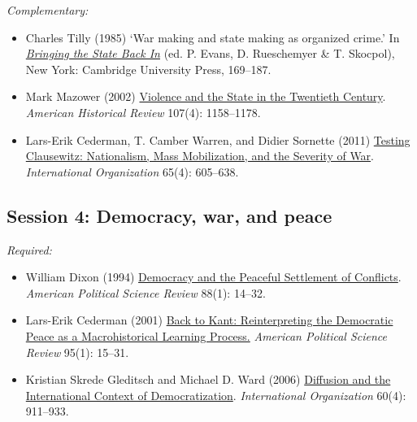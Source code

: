 \documentclass[12pt, a4paper]{article}
\begin{document}
\noindent\textit{Complementary:}

\begin{itemize}
  \item Charles Tilly (1985) `War making and state making as organized crime.' In \href{https://bibliotecas.uc3m.es/permalink/f/1qk6at5/34UC3M_ALMA21176158990004213}{\textit{Bringing the State Back In}} (ed. P. Evans, D. Rueschemyer \& T. Skocpol), New York: Cambridge University Press, 169--187.
	\item Mark Mazower (2002) \href{https://doi.org/10.1086/ahr/107.4.1158}{Violence and the State in the Twentieth Century}. \textit{American Historical Review} 107(4): 1158--1178.
	\item Lars-Erik Cederman, T.	Camber Warren, and Didier Sornette (2011) \href{https://doi.org/10.1017/S0020818311000245}{Testing Clausewitz: Nationalism, Mass Mobilization, and the Severity of War}. \textit{International Organization} 65(4): 605--638.
\end{itemize}

\vspace{20pt}
\hline
\subsection*{Session 4: Democracy, war, and peace}

\noindent\textit{Required:}

\begin{itemize}
	\item William Dixon (1994) \href{https://doi.org/10.2307/2944879}{Democracy and the Peaceful Settlement of Conflicts}. \textit{American Political Science Review} 88(1): 14--32.
  \item Lars-Erik Cederman (2001) \href{https://doi.org/10.1017/S0003055401000028}{Back to Kant: Reinterpreting the Democratic Peace as a Macrohistorical Learning Process.} \textit{American Political Science Review} 95(1): 15--31.
	\item Kristian Skrede Gleditsch and Michael D. Ward (2006) \href{https://doi.org/10.1017/S0020818306060309}{Diffusion and the International Context of Democratization}. \textit{International Organization} 60(4): 911--933.
	\end{itemize}
\end{document}
